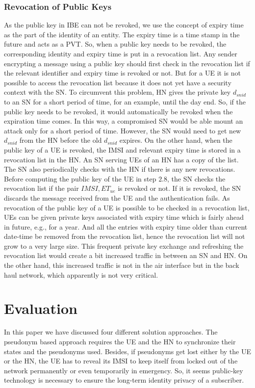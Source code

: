 \documentclass[runningheads,a4paper]{llncs} %
\begin{document}
\subsubsection{Revocation of Public Keys}
As the public key in IBE can not be revoked, we use the concept of expiry time as the part of the identity of an entity. The expiry time is a time stamp in the future and acts as a PVT. So, when a public key needs to be revoked, the corresponding identity and expiry time is put in a revocation list. Any sender encrypting a message using a public key should first check in the revocation list if the relevant identifier and expiry time is revoked or not. But for a UE it is not possible to access the revocation list because it does not yet have a security context with the SN. To circumvent this problem, HN gives the private key $d_{snid}$ to an SN for a short period of time, for an example, until the day end. So, if the public key needs to be revoked, it would automatically be revoked when the expiration time comes. In this way, a compromised SN would be able mount an attack only for a short period of time. However, the SN would need to get new $d_{snid}$ from the HN before the old $d_{snid}$ expires. On the other hand, when the public key of a UE is revoked, the IMSI and relevant expiry time is stored in a revocation list in the HN.  An SN serving UEs of an HN has a copy of the list. The SN also periodically checks with the HN if there is any new revocations. Before computing the public key of the UE in step $2.8$, the SN checks the revocation list if the pair $IMSI,ET_{ue}$ is revoked or not. If it is revoked, the SN discards the message received from the UE and the authentication fails. As revocation of the public key of a UE is possible to be checked in a revocation list, UEs can be given private keys associated with expiry time which is fairly ahead in future, e.g., for a year. And all the entries with expiry time older than current date-time be removed from the revocation list, hence the revocation list will not grow to a very large size. This frequent private key exchange and refreshing the revocation list would create a bit increased traffic in between an SN and HN. On the other hand, this increased traffic is not in the air interface but in the back haul network, which apparently is not very critical. 


\section{Evaluation}
\label{sec:evaluation}
In this paper we have discussed four different solution approaches. The pseudonym based approach requires the UE and the HN to synchronize their states and the pseudonyms used. Besides, if pseudonyms get lost either by the UE or the HN, the UE has to reveal its IMSI to keep itself from locked out of the network permanently or even temporarily in emergency. So, it seems public-key technology is necessary to ensure the long-term identity privacy of a subscriber. 
\end{document}
